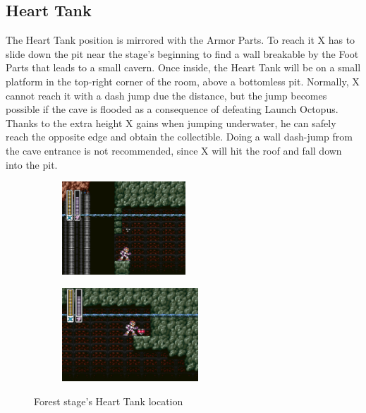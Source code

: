 \subsection{Heart Tank}
The Heart Tank position is mirrored with the Armor Parts. To reach it X has to slide down the pit near the stage's beginning to find a wall breakable by the Foot Parts that leads to a small cavern. Once inside, the Heart Tank will be on a small platform in the top-right corner of the room, above a bottomless pit. Normally, X cannot reach it with a dash jump due the distance, but the jump becomes possible if the cave is flooded as a consequence of defeating Launch Octopus. Thanks to the extra height X gains when jumping underwater, he can safely reach the opposite edge and obtain the collectible. Doing a wall dash-jump from the cave entrance is not recommended, since X will hit the roof and fall down into the pit.
\begin{figure}[htp]
	\centering
	\begin{subfigure}{0.45\linewidth}
		\centering
		\includegraphics[height=3.5cm]{figures/X1/Sting_chameleon/Sting_heart_1.jpg}
	\end{subfigure}
	\begin{subfigure}{0.45\linewidth}
		\centering
		\includegraphics[height=3.5cm]{figures/X1/Sting_chameleon/Sting_heart_2.jpg}
	\end{subfigure}
	\caption{Forest stage's Heart Tank location}
\end{figure}


